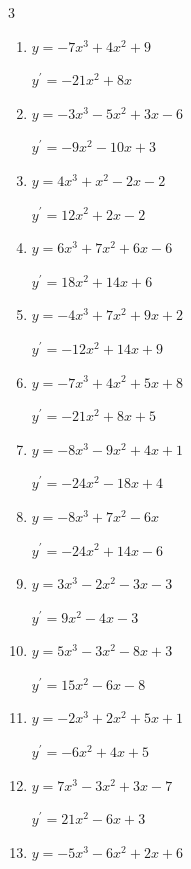 \begin{multicols}{3}
\begin{enumerate}
        $\displaystyle y^{\prime}=-15x^{2}+6x+8$

  \item $y=-7x^{3}+4x^{2}+9$

        $\displaystyle y^{\prime}=-21x^{2}+8x$

  \item $y=-3x^{3}-5x^{2}+3x-6$

        $\displaystyle y^{\prime}=-9x^{2}-10x+3$

  \item $y=4x^{3}+x^{2}-2x-2$

        $\displaystyle y^{\prime}=12x^{2}+2x-2$

  \item $y=6x^{3}+7x^{2}+6x-6$

        $\displaystyle y^{\prime}=18x^{2}+14x+6$

  \item $y=-4x^{3}+7x^{2}+9x+2$

        $\displaystyle y^{\prime}=-12x^{2}+14x+9$

  \item $y=-7x^{3}+4x^{2}+5x+8$

        $\displaystyle y^{\prime}=-21x^{2}+8x+5$

  \item $y=-8x^{3}-9x^{2}+4x+1$

        $\displaystyle y^{\prime}=-24x^{2}-18x+4$

  \item $y=-8x^{3}+7x^{2}-6x$

        $\displaystyle y^{\prime}=-24x^{2}+14x-6$

  \item $y=3x^{3}-2x^{2}-3x-3$

        $\displaystyle y^{\prime}=9x^{2}-4x-3$

  \item $y=5x^{3}-3x^{2}-8x+3$

        $\displaystyle y^{\prime}=15x^{2}-6x-8$

  \item $y=-2x^{3}+2x^{2}+5x+1$

        $\displaystyle y^{\prime}=-6x^{2}+4x+5$

  \item $y=7x^{3}-3x^{2}+3x-7$

        $\displaystyle y^{\prime}=21x^{2}-6x+3$

  \item $y=-5x^{3}-6x^{2}+2x+6$


\end{enumerate}
\end{multicols}
